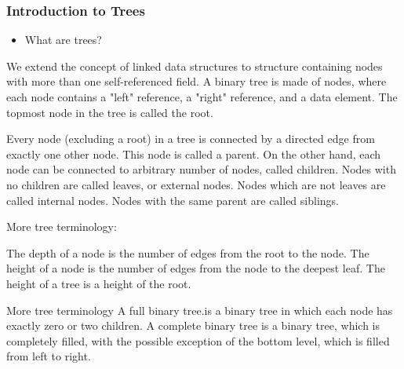 \documentclass[12pt]{beamer} %
\begin{document}
\begin{frame}
\frametitle{Introduction to Trees}
\begin{itemize}
\item What are trees?
\end{itemize}
\end{frame}
\begin{frame}
We extend the concept of linked data structures to structure containing nodes with more than one self-referenced field. A binary tree is made of nodes, where each node contains a "left" reference, a "right" reference, and a data element. The topmost node in the tree is called the root.
\end{frame}
\begin{frame}
Every node (excluding a root) in a tree is connected by a directed edge from exactly one other node. This node is called a parent. On the other hand, each node can be connected to arbitrary number of nodes, called children. Nodes with no children are called leaves, or external nodes. Nodes which are not leaves are called internal nodes. Nodes with the same parent are called siblings.
\end{frame}
\begin{frame}   
More tree terminology:

The depth of a node is the number of edges from the root to the node.
The height of a node is the number of edges from the node to the deepest leaf.
The height of a tree is a height of the root.
\end{frame}
\begin{frame}
More tree terminology
A full binary tree.is a binary tree in which each node has exactly zero or two children.
A complete binary tree is a binary tree, which is completely filled, with the possible exception of the bottom level, which is filled from left to right.
\end{frame}
\end{document}
